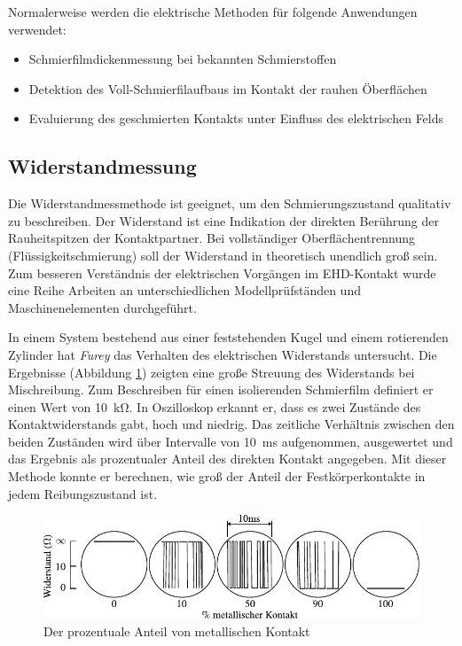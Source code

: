 Normalerweise werden die elektrische Methoden für folgende Anwendungen verwendet:
\begin{itemize}
    \item Schmierfilmdickenmessung bei bekannten Schmierstoffen
    \item Detektion des Voll-Schmierfilaufbaus im Kontakt der rauhen Öberflächen
    \item Evaluierung des geschmierten Kontakts unter Einfluss des elektrischen Felds
\end{itemize}

\subsection{Widerstandmessung}
\label{sub:wiederstandmessung}

Die Widerstandmessmethode ist geeignet, um den Schmierungszustand qualitativ zu beschreiben.
Der Widerstand ist eine Indikation der direkten Berührung der Rauheitspitzen der Kontaktpartner.
Bei vollständiger Oberflächentrennung (Flüssigkeitschmierung) soll der Widerstand in theoretisch unendlich groß sein.
Zum besseren Verständnis der elektrischen Vorgängen im EHD-Kontakt wurde eine Reihe Arbeiten an unterschiedlichen Modellprüfständen und Maschinenelementen durchgeführt.

In einem System bestehend aus einer feststehenden Kugel und einem rotierenden Zylinder hat \textit{Furey} \cite{furey_1961} das Verhalten des elektrischen Widerstands untersucht.
Die Ergebnisse (Abbildung \ref{fig:resistance_vs_time_furey}) zeigten eine große Streuung des Widerstands bei Mischreibung.
Zum Beschreiben für einen isolierenden Schmierfilm definiert er einen Wert von \SI{10}{\kilo\ohm}.
In Oszilloskop erkannt er, dass es zwei Zustände des Kontaktwiderstands gabt, hoch und niedrig.
Das zeitliche Verhältnis zwischen den beiden Zuständen wird über Intervalle von \SI{10}{\milli\second} aufgenommen, ausgewertet und das Ergebnis als prozentualer Anteil des direkten Kontakt angegeben.
Mit dieser Methode konnte er berechnen, wie groß der Anteil der Festkörperkontakte in jedem Reibungszustand ist.
\begin{figure}[htb]
    \centering
    \includegraphics[]{./images/resistance_vs_time_furey.pdf}
    \caption{Der prozentuale Anteil von metallischen Kontakt \cite{furey_1961}}
    \label{fig:resistance_vs_time_furey}
\end{figure}
%

